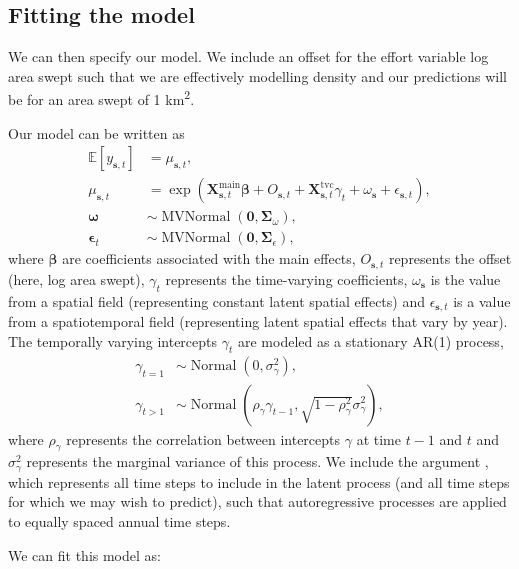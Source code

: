 \documentclass[article]{jss}\usepackage[]{graphicx}\usepackage[dvipsnames]{xcolor}
\begin{document}
\subsection{Fitting the model}

We can then specify our model. We include an offset \citep[][p.~206]{mccullagh1989} for the effort variable log area swept such that we are effectively modelling density and our predictions will be for an area swept of 1 km\textsuperscript{2}.

Our model can be written as
\[
\begin{aligned}
\mathbb{E}[y_{\bm{s},t}] &= \mu_{\bm{s},t},\\
\mu_{\bm{s},t} &=
\exp \left( \bm{X}^{\mathrm{main}}_{\bm{s},t} \bm{\beta} +
O_{\bm{s},t} +
\bm{X}^{\mathrm{tvc}}_{\bm{s},t} \gamma_t +
\omega_{\bm{s}} +
\epsilon_{\bm{s},t}
\right),\\
\bm{\omega} &\sim \operatorname{MVNormal} \left( \bm{0}, \bm{\Sigma}_\omega \right),\\
\bm{\epsilon}_{t} &\sim \operatorname{MVNormal} \left( \bm{0}, \bm{\Sigma}_{\epsilon} \right),
\end{aligned}
\]
where \(\bm{\beta}\) are coefficients associated with the main effects, \(O_{\bm{s},t}\) represents the offset (here, log area swept), \(\gamma_t\) represents the time-varying coefficients, \(\omega_{\bm{s}}\) is the value from a spatial field (representing constant latent spatial effects) and \(\epsilon_{\bm{s},t}\) is a value from a spatiotemporal field  (representing latent spatial effects that vary by year).
The temporally varying intercepts \(\gamma_t\) are modeled as a stationary AR(1) process,
\[
\begin{aligned}
  \gamma_{t=1} &\sim \operatorname{Normal} \left(0, \sigma^2_{\gamma} \right),\\
  \gamma_{t>1} &\sim \operatorname{Normal} \left(\rho_\gamma\gamma_{t-1}, \sqrt{1 - \rho_\gamma^2} \sigma^2_{\gamma} \right),
\end{aligned}
\]
where \(\rho_\gamma\) represents the correlation between intercepts \(\gamma\) at time $t-1$ and $t$ and $\sigma^2_{\gamma}$ represents the marginal variance of this process.
We include the argument , which represents all time steps to include in the latent process (and all time steps for which we may wish to predict), such that autoregressive processes are applied to equally spaced annual time steps.

We can fit this model as:

\begin{Schunk}
\end{Schunk}
\end{document}

